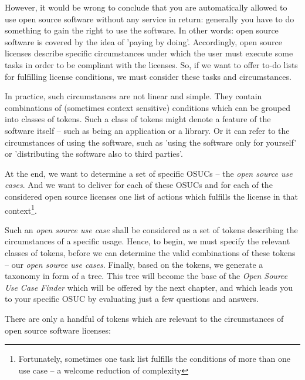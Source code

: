 However, it would be wrong to conclude that you are automatically allowed to use
open source software without any service in return: generally you have to do
something to gain the right to use the software. In other words: open source
software is covered by the idea of ’paying by doing’. Accordingly, open source
li\-cen\-ses describe specific circumstances under which the user must execute
some tasks in order to be compliant with the licenses. So, if we want to offer
to-do lists for fulfilling license conditions, we must consider these tasks and
circumstances.

In practice, such circumstances are not linear and simple. They contain
combinations of (sometimes context sensitive) conditions which can be grouped
into classes of tokens. Such a class of tokens might denote a feature of the
software itself -- such as being an application or a library. Or it can refer to
the circumstances of using the software, such as 'using the software only for
yourself' or 'distributing the software also to third parties'.

At the end, we want to determine a set of specific OSUCs -- the \emph{open source
use cases}. And we want to deliver for each of these OSUCs and for each of the
considered open source licenses one list of actions which fulfills the license
in that context\footnote{Fortunately, sometimes one task list fulfills the
conditions of more than one use case -- a welcome reduction of complexity}.

Such an \emph{open source use case} shall be considered as a set of tokens
describing the circumstances of a specific usage. Hence, to begin, we must
specify the relevant classes of tokens, before we can determine the valid
combinations of these tokens -- our \emph{open source use cases}. Finally, based
on the tokens, we generate a taxonomy in form of a tree. This tree will become
the base of the \emph{Open Source Use Case Finder} which will be offered by the
next chapter, and which leads you to your specific OSUC by evaluating just a few
questions and answers.

There are only a handful of tokens which are relevant to the circumstances of
open source software licenses:

